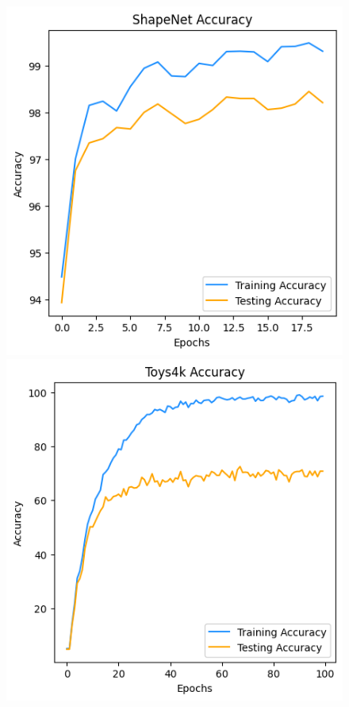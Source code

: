 \documentclass[conference]{IEEEtran}
\begin{document}
\begin{figure}
{        \includegraphics[scale=0.4]{Images/3DCNN/ShapeNet/acc.png}
        \includegraphics[scale=0.4]{Images/3DCNN/Toys4K/acc.png}
    }%
    \\
\end{figure}
\end{document}
